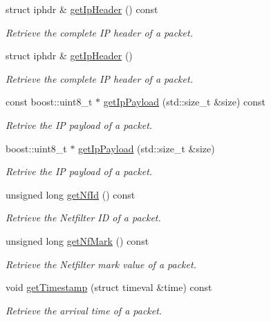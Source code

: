 \begin{DoxyCompactItemize}
struct iphdr \& \hyperlink{classIPQ_1_1IpqIpPacket_abf46954191d96b4e2fe136f79ba6c8ac}{get\-Ip\-Header} () const 
\begin{DoxyCompactList}\small\item\em \-Retrieve the complete \-I\-P header of a packet. \end{DoxyCompactList}\item 
struct iphdr \& \hyperlink{classIPQ_1_1IpqIpPacket_aa6e89b7927e748d00b9562e85192b492}{get\-Ip\-Header} ()
\begin{DoxyCompactList}\small\item\em \-Retrieve the complete \-I\-P header of a packet. \end{DoxyCompactList}\item 
const boost\-::uint8\-\_\-t $\ast$ \hyperlink{classIPQ_1_1IpqIpPacket_adc020ff0aceeba0577e4bb90dcc6f86f}{get\-Ip\-Payload} (std\-::size\-\_\-t \&size) const 
\begin{DoxyCompactList}\small\item\em \-Retrive the \-I\-P payload of a packet. \end{DoxyCompactList}\item 
boost\-::uint8\-\_\-t $\ast$ \hyperlink{classIPQ_1_1IpqIpPacket_a47343dd1a4fc52c8fda6de4aa313a688}{get\-Ip\-Payload} (std\-::size\-\_\-t \&size)
\begin{DoxyCompactList}\small\item\em \-Retrive the \-I\-P payload of a packet. \end{DoxyCompactList}\item 
unsigned long \hyperlink{classIPQ_1_1IpqPacket_ac3cbbe2b61e12730ffe231fa19c96e5a}{get\-Nf\-Id} () const 
\begin{DoxyCompactList}\small\item\em \-Retrieve the \-Netfilter \-I\-D of a packet. \end{DoxyCompactList}\item 
unsigned long \hyperlink{classIPQ_1_1IpqPacket_ab97f0a4348e53cb69ed1da74e422dc78}{get\-Nf\-Mark} () const 
\begin{DoxyCompactList}\small\item\em \-Retrieve the \-Netfilter mark value of a packet. \end{DoxyCompactList}\item 
void \hyperlink{classIPQ_1_1IpqPacket_a430ce4f89e651724efdf56c9c1b1647e}{get\-Timestamp} (struct timeval \&time) const 
\begin{DoxyCompactList}\small\item\em \-Retrieve the arrival time of a packet. \end{DoxyCompactList}\item 

\end{DoxyCompactItemize}
